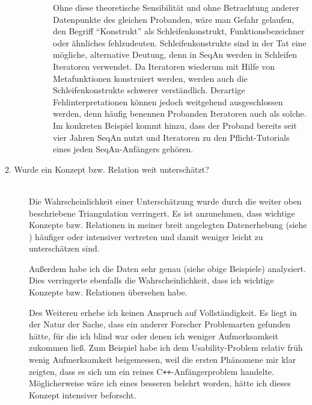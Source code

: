 \begin{description}
\begin{description}
    Ohne diese theoretische Sensibilität und ohne Betrachtung anderer Datenpunkte des gleichen Probanden, wäre man Gefahr gelaufen, den Begriff ``Konstrukt'' als Schleifenkonstrukt, Funktionsbezeichner oder ähnliches fehlzudeuten. Schleifenkonstrukte sind in der Tat eine mögliche, alternative Deutung, denn in SeqAn werden in Schleifen Iteratoren verwendet. Da Iteratoren wiederum  mit Hilfe von Metafunktionen konstruiert werden, werden auch die Schleifenkonstrukte schwerer verständlich. Derartige Fehlinterpretationen können jedoch weitgehend ausgeschlossen werden, denn häufig benennen Probanden Iteratoren auch als solche. Im konkreten Beispiel kommt hinzu, dass der Proband bereits seit vier Jahren SeqAn nutzt und Iteratoren zu den Pflicht-Tutorials eines jeden SeqAn-Anfängers gehören.
  \end{description}
  
  \item[2. Wurde ein Konzept bzw. Relation weit unterschätzt?] \hfill \\
  Die Wahrscheinlichkeit einer Unterschätzung wurde durch die weiter oben beschriebene Triangulation verringert. Es ist anzunehmen, dass wichtige Konzepte bzw. Relationen in meiner breit angelegten Datenerhebung (siehe ) häufiger oder intensiver vertreten und damit weniger leicht zu unterschätzen sind.
  
  Außerdem habe ich die Daten sehr genau (siehe obige Beispiele) analysiert. Dies verringerte ebenfalls die Wahrscheinlichkeit, dass ich wichtige Konzepte bzw. Relationen übersehen habe.
  
  Des Weiteren erhebe ich keinen Anspruch auf Vollständigkeit. Es liegt in der Natur der Sache, dass ein anderer Forscher Problemarten gefunden hätte, für die ich blind war oder denen ich weniger Aufmerksamkeit zukommen ließ. Zum Beispiel habe ich dem Usability-Problem  relativ früh wenig Aufmerksamkeit beigemessen, weil die ersten Phänomene mir klar zeigten, dass es sich um ein reines C\texttt{++}-Anfängerproblem handelte. Möglicherweise wäre ich eines besseren belehrt worden, hätte ich dieses Konzept intensiver beforscht.
  

\end{description}
